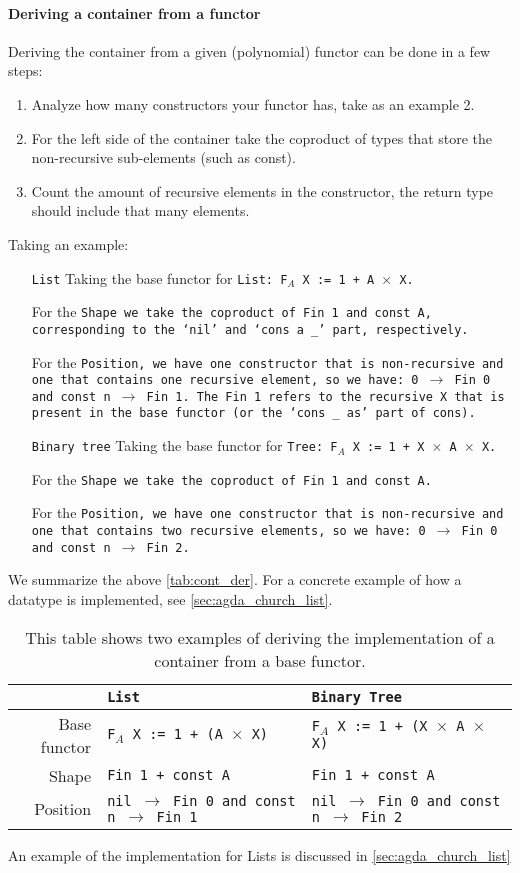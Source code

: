 \paragraph{Deriving a container from a functor}
Deriving the container from a given (polynomial) functor can be done in a few steps:
\begin{enumerate}
    \item Analyze how many constructors your functor has, take as an example 2.
    \item For the left side of the container take the coproduct of types that store the non-recursive sub-elements (such as const).
    \item Count the amount of recursive elements in the constructor, the return type should include that many elements.
\end{enumerate}
Taking an example:
\begin{itemize}
    \item[\tt{List}]
    Taking the base functor for \tt{List}: \tt{F$_A$ X := 1 + A $\times$ X}.

    For the \tt{Shape} we take the coproduct of \tt{Fin 1} and \tt{const A}, corresponding to the `\tt{nil}' and `\tt{cons a \_}' part, respectively.

    For the \tt{Position}, we have one constructor that is non-recursive and one that contains one recursive element, so we have:
    \tt{0 $\to$ Fin 0} and \tt{const n $\to$ Fin 1}.
    The Fin 1 refers to the recursive X that is present in the base functor (or the `\tt{cons \_ as}' part of cons).
    \item[\tt{Binary tree}]
    Taking the base functor for \tt{Tree}: \tt{F$_A$ X := 1 + X $\times$ A $\times$ X}.

    For the \tt{Shape} we take the coproduct of \tt{Fin 1} and \tt{const A}.

    For the \tt{Position}, we have one constructor that is non-recursive and one that contains two recursive elements, so we have:
    \tt{0 $\to$ Fin 0} and \tt{const n $\to$ Fin 2}.
\end{itemize}
We summarize the above \autoref{tab:cont_der}.
For a concrete example of how a datatype is implemented, see \autoref{sec:agda_church_list}.
\begin{table}[h]
  \centering
  \begin{tabular}{|r|l|l|}\hline
     & \tt{List} &  \tt{Binary Tree} \\\hline
    Base functor         & \tt{F$_A$ X := 1 + (A $\times$ X)}  & \tt{F$_A$ X := 1 + (X $\times$ A $\times$ X)} \\\hline
    Shape  & \tt{Fin 1 + const A} & \tt{Fin 1 + const A} \\\hline
    Position & \tt{nil $\to$ Fin 0 and const n $\to$ Fin 1} & \tt{nil $\to$ Fin 0 and const n $\to$ Fin 2} \\\hline
  \end{tabular}
  \caption{This table shows two examples of deriving the implementation of a container from a base functor.}
  \label{tab:cont_der}
\end{table}
An example of the implementation for Lists is discussed in \autoref{sec:agda_church_list}

